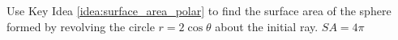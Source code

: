 {Use Key Idea \ref{idea:surface_area_polar} to find the surface area of the sphere formed by revolving the circle $r=2\cos\theta$ about the initial ray.
}
{$SA = 4\pi$
}

